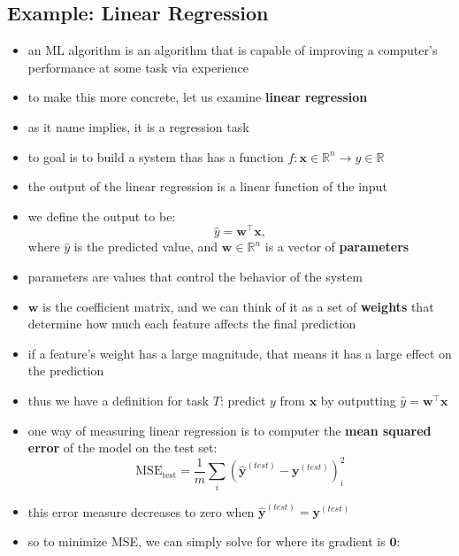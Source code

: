 \documentclass[11pt, twocolumn]{report}
\def\realnumbers{\mathbb{R}}
\begin{document}
\subsection{Example: Linear Regression}
\begin{itemize}
  \item an ML algorithm is an algorithm that is capable of improving a
    computer's performance at some task via experience
  \item to make this more concrete, let us examine \textbf{linear regression}
  \item as it name implies, it is a regression task
  \item to goal is to build a system thas has a function $f : \bm{x} \in
    \realnumbers^n \to y \in \realnumbers$
  \item the output of the linear regression is a linear function of the input
  \item we define the output to be:
    \begin{equation}
      \hat{y} = \bm{w}^\intercal\bm{x},
    \end{equation}
    where $\hat{y}$ is the predicted value, and $\bm{w} \in \realnumbers^n$ is
    a vector of \textbf{parameters}
  \item parameters are values that control the behavior of the system
  \item $\bm{w}$ is the coefficient matrix, and we can think of it as a set of
    \textbf{weights} that determine how much each feature affects the final
    prediction
  \item if a feature's weight has a large magnitude, that means it has a large
    effect on the prediction
  \item thus we have a definition for task $T$: predict $y$ from $\bm{x}$ by
    outputting $\hat{y} = \bm{w}^\intercal\bm{x}$
  \item one way of measuring linear regression is to computer the \textbf{mean
      squared error} of the model on the test set:
    \begin{equation}
      \text{MSE}_{\text{test}} = \frac{1}{m} \sum_i ( \hat{\bm{y}}^{(test)} -
      \bm{y}^{(test)})_i^2
    \end{equation}
  \item this error measure decreases to zero when $\hat{\bm{y}}^{(test)} =
    \bm{y}^{(test)}$
  \item so to minimize MSE, we can simply solve for where its gradient is
    $\bm{0}$:
    \begin{equation}

\end{equation}
\end{itemize}
\end{document}
